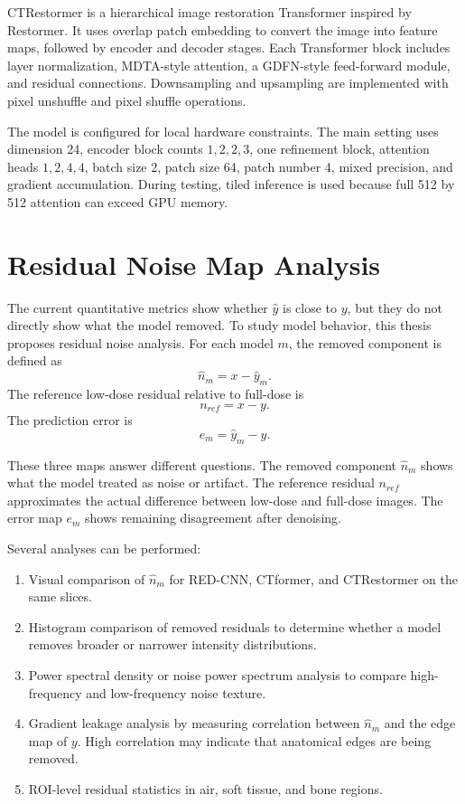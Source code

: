 \documentclass[12pt,a4paper]{report}
\begin{document}
CTRestormer is a hierarchical image restoration Transformer inspired by Restormer. It uses overlap patch embedding to convert the image into feature maps, followed by encoder and decoder stages. Each Transformer block includes layer normalization, MDTA-style attention, a GDFN-style feed-forward module, and residual connections. Downsampling and upsampling are implemented with pixel unshuffle and pixel shuffle operations.

The model is configured for local hardware constraints. The main setting uses dimension 24, encoder block counts \(1,2,2,3\), one refinement block, attention heads \(1,2,4,4\), batch size 2, patch size 64, patch number 4, mixed precision, and gradient accumulation. During testing, tiled inference is used because full 512 by 512 attention can exceed GPU memory.

\section{Residual Noise Map Analysis}

The current quantitative metrics show whether \(\hat{y}\) is close to \(y\), but they do not directly show what the model removed. To study model behavior, this thesis proposes residual noise analysis. For each model \(m\), the removed component is defined as
\begin{equation}
\hat{n}_m=x-\hat{y}_m.
\end{equation}
The reference low-dose residual relative to full-dose is
\begin{equation}
n_{ref}=x-y.
\end{equation}
The prediction error is
\begin{equation}
e_m=\hat{y}_m-y.
\end{equation}

These three maps answer different questions. The removed component \(\hat{n}_m\) shows what the model treated as noise or artifact. The reference residual \(n_{ref}\) approximates the actual difference between low-dose and full-dose images. The error map \(e_m\) shows remaining disagreement after denoising.

Several analyses can be performed:

\begin{enumerate}[leftmargin=*]
\item Visual comparison of \(\hat{n}_m\) for RED-CNN, CTformer, and CTRestormer on the same slices.
\item Histogram comparison of removed residuals to determine whether a model removes broader or narrower intensity distributions.
\item Power spectral density or noise power spectrum analysis to compare high-frequency and low-frequency noise texture.
\item Gradient leakage analysis by measuring correlation between \(\hat{n}_m\) and the edge map of \(y\). High correlation may indicate that anatomical edges are being removed.
\item ROI-level residual statistics in air, soft tissue, and bone regions.
\end{enumerate}
\end{document}
